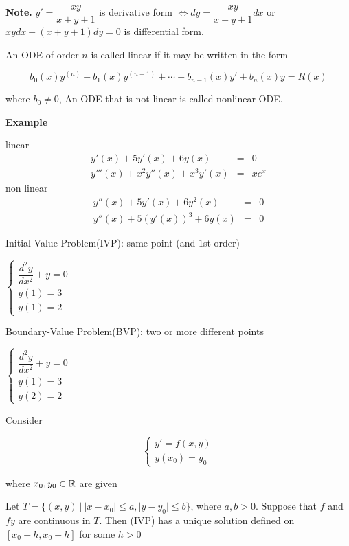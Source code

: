 \newpage

\textbf{Note.} $y' = \dfrac{xy}{x + y + 1}$ is derivative form $\Leftrightarrow dy = \dfrac{xy}{x+y+1}dx$ or $xydx - (x + y + 1)dy = 0$ is differential form.

\begin{defn}
	An ODE of order $n$ is called linear if it may be written in the form
	
	$$b_0(x)y^{(n)} + b_1(x)y^{(n-1)} + \cdots + b_{n-1}(x)y' + b_n(x)y = R(x)$$
	
	where $b_0 \neq 0$, An ODE that is not linear is called nonlinear ODE.
\end{defn}

\textbf{Example}
\begin{tcolorbox}
linear 
	\begin{eqnarray*}
		y'(x) + 5y'(x) + 6y(x) &=& 0\\
		y'''(x) + x^2 y''(x) + x^3y'(x) &=& xe^x
	\end{eqnarray*}
non linear
	\begin{eqnarray*}
		y''(x) + 5y'(x) + 6y^2(x) &=& 0\\
		y''(x) + 5(y'(x))^3 + 6y(x) &=& 0
	\end{eqnarray*}	
\end{tcolorbox}

Initial-Value Problem(IVP): same point (and $1$st order)
\begin{tcolorbox}
	$\begin{cases}
		\dfrac{d^2 y}{dx^2} + y = 0\\ y(1) = 3 \\ y(1) = 2
	\end{cases}$
\end{tcolorbox}

Boundary-Value Problem(BVP): two or more different points

\begin{tcolorbox}
	$\begin{cases}
		\dfrac{d^2 y}{dx^2} + y = 0\\ y(1) = 3\\ y(2) = 2
	\end{cases}$
\end{tcolorbox}

\newpage

\begin{thm*}
	Consider
	
	$$\begin{cases}y' = f(x,y) \\ y(x_0) = y_0\end{cases}$$
	
	where $x_0,y_0 \in \mathbb{R}$ are given
	
	Let $T = \{(x,y)~|~ |x-x_0| \leq a,|y-y_0| \leq b\}$, where $a,b > 0$. Suppose that $f$ and $fy$ are continuous in $T$. Then (IVP) has a unique solution defined on $[x_0 - h,x_0 + h]$ for some $h > 0$
\end{thm*}

